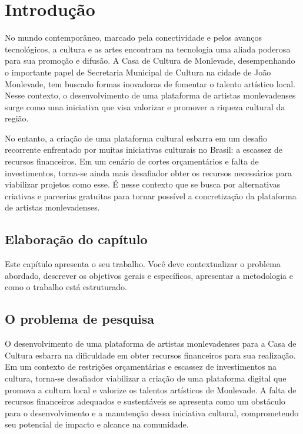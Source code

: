 \chapter{Introdução}
\label{cap:introducao}

No mundo contemporâneo, marcado pela conectividade e pelos avanços tecnológicos, a cultura e as artes encontram na tecnologia uma aliada poderosa para sua promoção e difusão. A Casa de Cultura de Monlevade, desempenhando o importante papel de Secretaria Municipal de Cultura na cidade de João Monlevade, tem buscado formas inovadoras de fomentar o talento artístico local. Nesse contexto, o desenvolvimento de uma plataforma de artistas monlevadenses surge como uma iniciativa que visa valorizar e promover a riqueza cultural da região.

No entanto, a criação de uma plataforma cultural esbarra em um desafio recorrente enfrentado por muitas iniciativas culturais no Brasil: a escassez de recursos financeiros. Em um cenário de cortes orçamentários e falta de investimentos, torna-se ainda mais desafiador obter os recursos necessários para viabilizar projetos como esse. É nesse contexto que se busca por alternativas criativas e parcerias gratuitas para tornar possível a concretização da plataforma de artistas monlevadenses.


\section{Elaboração do capítulo}

Este capítulo apresenta o seu trabalho. Você deve contextualizar o problema abordado, descrever os objetivos gerais e específicos, apresentar a metodologia e como o trabalho está estruturado.

\section{O problema de pesquisa}
\label{sec:problema}

O desenvolvimento de uma plataforma de artistas monlevadenses para a Casa de Cultura esbarra na dificuldade em obter recursos financeiros para sua realização. Em um contexto de restrições orçamentárias e escassez de investimentos na cultura, torna-se desafiador viabilizar a criação de uma plataforma digital que promova a cultura local e valorize os talentos artísticos de Monlevade. A falta de recursos financeiros adequados e sustentáveis se apresenta como um obstáculo para o desenvolvimento e a manutenção dessa iniciativa cultural, comprometendo seu potencial de impacto e alcance na comunidade.

